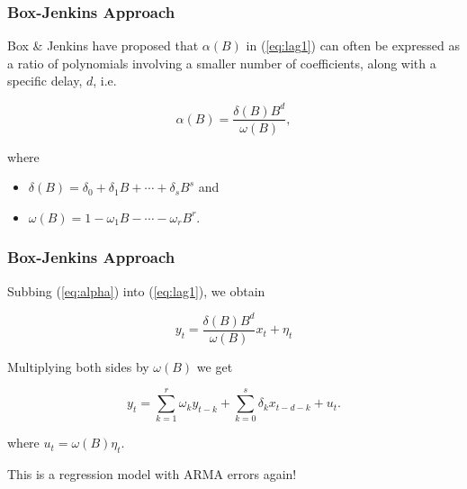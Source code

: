 \documentclass[%
xcolor=pdftex]{beamer}
\begin{document}
\begin{frame}
\frametitle{Box-Jenkins Approach}

Box \& Jenkins have proposed that $\alpha(B)$ in (\ref{eq:lag1}) can often be expressed as a ratio of polynomials involving a smaller number of coefficients, along with a specific delay, $d$, i.e.

\begin{equation} \label{eq:alpha}
\alpha(B) = \frac{\delta(B) B^d}{\omega(B)},
\end{equation}

where 

\begin{itemize}

\item $\delta(B) = \delta_0 + \delta_1 B + \cdots + \delta_s B^s$ and
\item $\omega(B) = 1 - \omega_1 B - \cdots - \omega_r B^r$.

\end{itemize}

\end{frame}

\begin{frame}
\frametitle{Box-Jenkins Approach}

Subbing (\ref{eq:alpha}) into (\ref{eq:lag1}), we obtain

\begin{equation} \label{eq:lag2}
y_t = \frac{\delta(B) B^d}{\omega(B)} x_t + \eta_t
\end{equation}

Multiplying both sides by $\omega(B)$ we get

\begin{equation} \label{eq:reg}
y_t = \sum_{k=1}^r \omega_k y_{t-k} + \sum_{k=0}^s \delta_k x_{t-d-k} + u_t.
\end{equation}

where $u_t = \omega(B)\eta_t$.
\newline


This is a regression model with ARMA errors again!
\end{frame}
\end{document}
